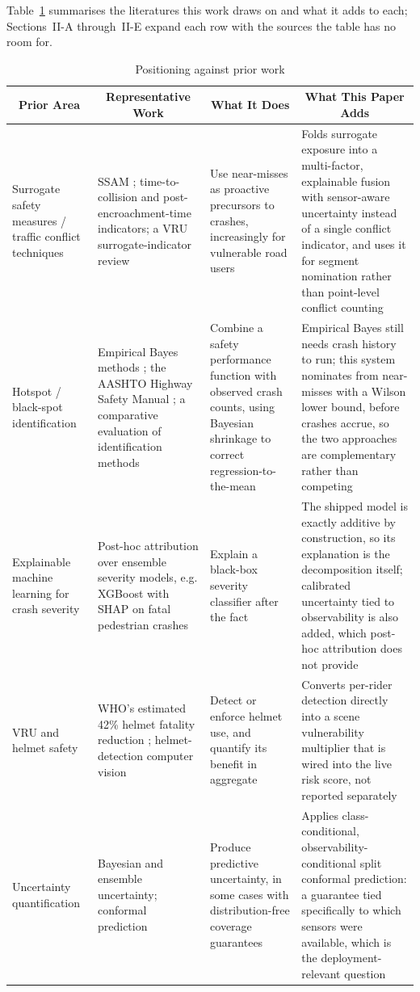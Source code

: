 \documentclass[journal]{IEEEtran}
\begin{document}
Table~\ref{tab:related} summarises the literatures this work draws on and what it adds to each; Sections~II-A through~II-E expand each row with the sources the table has no room for.

\begin{table}[!t]
\centering
\caption{Positioning against prior work}
\label{tab:related}
\footnotesize
\setlength{\tabcolsep}{4pt}
\begin{tabular}{p{2.3cm}p{3.6cm}p{4.3cm}p{4.3cm}}
\toprule
\multicolumn{1}{c}{\textbf{Prior Area}} & \multicolumn{1}{c}{\textbf{Representative Work}} & \multicolumn{1}{c}{\textbf{What It Does}} & \multicolumn{1}{c}{\textbf{What This Paper Adds}} \\
\midrule
Surrogate safety measures / traffic conflict techniques & SSAM \cite{gettman2008}; time-to-collision and post-encroachment-time indicators; a VRU surrogate-indicator review \cite{johnsson2018} & Use near-misses as proactive precursors to crashes, increasingly for vulnerable road users & Folds surrogate exposure into a multi-factor, explainable fusion with sensor-aware uncertainty instead of a single conflict indicator, and uses it for segment nomination rather than point-level conflict counting \\
Hotspot / black-spot identification & Empirical Bayes methods \cite{hauer2002}; the AASHTO Highway Safety Manual \cite{aashto2010}; a comparative evaluation of identification methods \cite{cheng2005} & Combine a safety performance function with observed crash counts, using Bayesian shrinkage to correct regression-to-the-mean & Empirical Bayes still needs crash history to run; this system nominates from near-misses with a Wilson lower bound, before crashes accrue, so the two approaches are complementary rather than competing \\
Explainable machine learning for crash severity & Post-hoc attribution over ensemble severity models, e.g. XGBoost with SHAP on fatal pedestrian crashes \cite{chang2022} & Explain a black-box severity classifier after the fact & The shipped model is exactly additive by construction, so its explanation is the decomposition itself; calibrated uncertainty tied to observability is also added, which post-hoc attribution does not provide \\
VRU and helmet safety & WHO's estimated 42\% helmet fatality reduction \cite{who2006}; helmet-detection computer vision \cite{jia2021,agorku2023} & Detect or enforce helmet use, and quantify its benefit in aggregate & Converts per-rider detection directly into a scene vulnerability multiplier that is wired into the live risk score, not reported separately \\
Uncertainty quantification & Bayesian and ensemble uncertainty; conformal prediction \cite{vovk2022,angelopoulos2023,romano2020} & Produce predictive uncertainty, in some cases with distribution-free coverage guarantees & Applies class-conditional, observability-conditional split conformal prediction: a guarantee tied specifically to which sensors were available, which is the deployment-relevant question \\
\bottomrule
\end{tabular}
\end{table}
\end{document}
